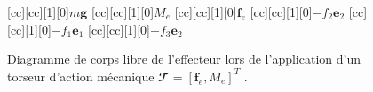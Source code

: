 \begin{figure}[h!]
\centering
{}[cc][cc][1][0]{\scriptsize$m\textbf{g}$}
[cc][cc][1][0]{\scriptsize$M_e$}
[cc][cc][1][0]{\scriptsize$\mathbf{f}_e$}
[cc][cc][1][0]{\scriptsize$-f_2\textbf{e}_2$}
[cc][cc][1][0]{\scriptsize$-f_1\textbf{e}_1$}
[cc][cc][1][0]{\scriptsize$-f_3\textbf{e}_2$}
\caption[DCL de l'effecteur avec forces externes]{\label{chap1:fig:equi_stat_ext}Diagramme de corps libre de l'effecteur lors de l'application d'un torseur d'action mécanique $\mathbfcal{T}=[\mathbf{f}_e,M_e]^T$ .}
\end{figure}